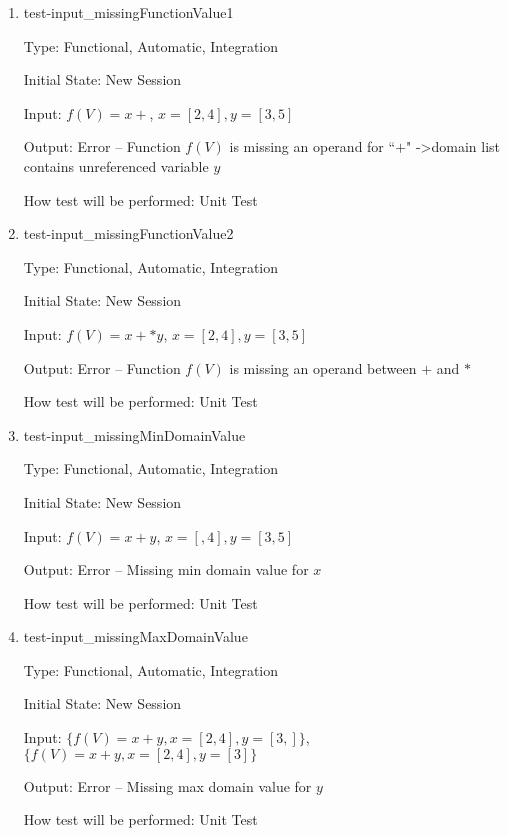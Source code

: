 \documentclass[12pt, titlepage]{article}
\begin{document}
\begin{enumerate}
	
	\item{test-input\_missingFunctionValue1}
	
	Type: Functional, Automatic, Integration
	
	Initial State: New Session
	
	Input: $f(V) = x +$, $x = [2,4], y = [3,5]$
	
	Output: Error -- Function $f(V)$ is missing an operand for ``$+$" 
	-\textgreater domain list contains unreferenced variable $y$
	
	How test will be performed: Unit Test\\
	
	\item{test-input\_missingFunctionValue2}
	
	Type: Functional, Automatic, Integration
	
	Initial State: New Session
	
	Input: $f(V) = x + * y$, $x = [2,4], y = [3,5]$
	
	Output: Error -- Function $f(V)$ is missing an operand between $+$ and $*$
	
	How test will be performed: Unit Test\\
	
	\item{test-input\_missingMinDomainValue}
	
	Type: Functional, Automatic, Integration
	
	Initial State: New Session
	
	Input: $f(V) = x + y$, $x = [,4], y = [3,5]$
	
	Output: Error -- Missing min domain value for $x$
	
	How test will be performed: Unit Test\\
	
	\item{test-input\_missingMaxDomainValue}
	
	Type: Functional, Automatic, Integration
	
	Initial State: New Session
	
	Input: $\{f(V) = x + y, x = [2,4], y = [3,]\}$, $\{f(V) = x + y, x = 
	[2,4], y = [3]\}$
	
	Output: Error -- Missing max domain value for $y$
	
	How test will be performed: Unit Test
	
\end{enumerate}
\end{document}
